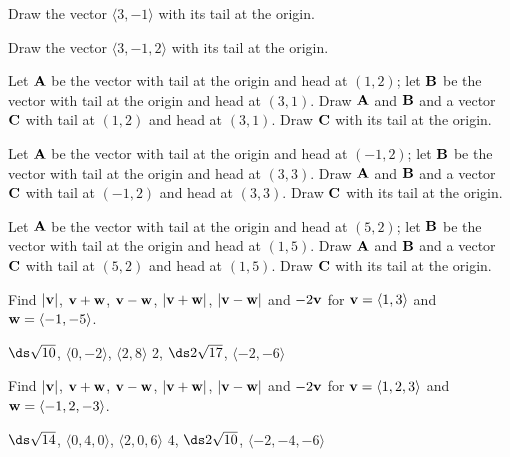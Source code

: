 \begin{exercises}

\begin{exercise} Draw the vector $\langle 3,-1\rangle$ with its tail at the
origin. 

\begin{exercise} Draw the vector $\langle 3,-1,2\rangle$ with its tail at the
origin. 

\begin{exercise} Let ${\bf A}$ be the vector with tail at the origin and head
at $(1,2)$; let ${\bf B}$ be the vector with tail at the origin and head
at $(3,1)$. Draw ${\bf A}$ and ${\bf B}$ and a vector ${\bf C}$ with 
tail at $(1,2)$ and head at $(3,1)$. Draw $\bf C$ with its tail at the origin.

\begin{exercise} Let ${\bf A}$ be the vector with tail at the origin and head
at $(-1,2)$; let ${\bf B}$ be the vector with tail at the origin and head
at $(3,3)$. Draw ${\bf A}$ and ${\bf B}$ and a vector ${\bf C}$ with 
tail at $(-1,2)$ and head at $(3,3)$. Draw $\bf C$ with its tail at the origin.

\begin{exercise} Let ${\bf A}$ be the vector with tail at the origin and head
at $(5,2)$; let ${\bf B}$ be the vector with tail at the origin and head
at $(1,5)$. Draw ${\bf A}$ and ${\bf B}$ and a vector ${\bf C}$ with 
tail at $(5,2)$ and head at $(1,5)$. Draw $\bf C$ with its tail at the origin.

\begin{exercise} Find $|{\bf v}|$, ${\bf v}+{\bf w}$, ${\bf v}-{\bf w}$,
$|{\bf v}+{\bf w}|$, $|{\bf v}-{\bf w}|$ and $-2{\bf v}$ for
${\bf v} = \langle 1,3\rangle$ and ${\bf w} = \langle -1,-5\rangle$.
\begin{answer} $\ds \sqrt{10}$, $\langle 0,-2\rangle$, $\langle 2,8\rangle$
2, $\ds 2\sqrt{17}$, $\langle -2,-6\rangle$
\end{answer}\end{exercise}

\begin{exercise} Find $|{\bf v}|$, ${\bf v}+{\bf w}$, ${\bf v}-{\bf w}$,
$|{\bf v}+{\bf w}|$, $|{\bf v}-{\bf w}|$ and $-2{\bf v}$ for
${\bf v} = \langle 1,2,3\rangle$ and ${\bf w} = \langle -1,2,-3\rangle$.
\begin{answer} $\ds \sqrt{14}$, $\langle 0,4,0\rangle$, $\langle 2,0,6\rangle$
4, $\ds 2\sqrt{10}$, $\langle -2,-4,-6\rangle$
\end{answer}\end{exercise}


\end{exercise}
\end{exercise}
\end{exercise}
\end{exercise}
\end{exercise}
\end{exercises}
